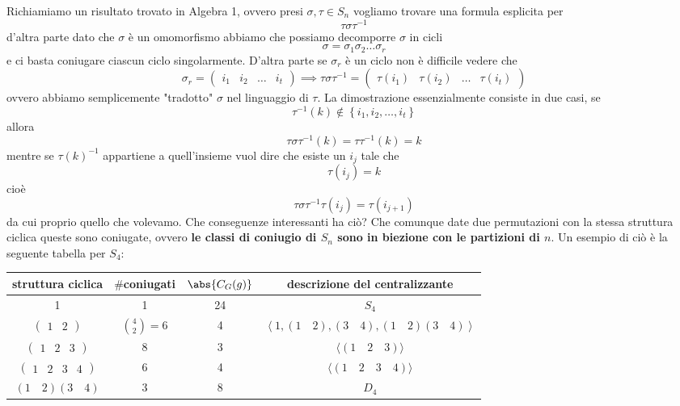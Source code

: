 \documentclass[11pt]{scrartcl}
\begin{document}
	Richiamiamo un risultato trovato in Algebra 1, ovvero presi $\sigma,\tau\in S_n$ vogliamo trovare una formula esplicita per
	$$\tau\sigma\tau^{-1}$$
	d'altra parte dato che $\sigma$ è un omomorfismo abbiamo che possiamo decomporre $\sigma$ in cicli 
	$$\sigma=\sigma_1\sigma_2\dots \sigma_r$$
	e ci basta coniugare ciascun ciclo singolarmente. D'altra parte se $\sigma_r$ è un ciclo non è difficile vedere che
	$$\sigma_r=\begin{pmatrix}
		i_1 & i_2 & \dots & i_t
	\end{pmatrix}\implies \tau\sigma\tau^{-1}=\begin{pmatrix}
	\tau(i_1) & \tau(i_2) & \dots & \tau(i_t)
	\end{pmatrix}$$
	ovvero abbiamo semplicemente "tradotto" $\sigma$ nel linguaggio di $\tau$. La dimostrazione essenzialmente consiste in due casi, se 
	$$\tau^{-1}(k)\not\in \left\{i_1,i_2,\dots,i_t\right\}$$
	allora 
	$$\tau\sigma\tau^{-1}(k)=\tau\tau^{-1}(k)=k$$
	mentre se $\tau(k)^{-1}$ appartiene a quell'insieme vuol dire che esiste un $i_j$ tale che
	$$\tau(i_j)=k$$
	cioè
	$$\tau\sigma \tau^{-1}\tau(i_j)=\tau(i_{j+1})$$
	da cui proprio quello che volevamo. Che conseguenze interessanti ha ciò? Che comunque date due permutazioni con la stessa struttura ciclica queste sono coniugate, ovvero \textbf{le classi di coniugio di $S_n$ sono in biezione con le partizioni di $n$}. Un esempio di ciò è la seguente tabella per $S_4$:
	\begin{center}
		\begin{tabular}{|c|c|c|c|}
			\hline
			struttura ciclica & $\#$coniugati & $\abs{C_G(g)}$ & descrizione del centralizzante \\
			\hline
			1 & 1 & 24 & $S_4$ \\
			\hline
			$\begin{pmatrix}
				1 & 2
			\end{pmatrix}$ & $\binom{4}{2}=6$ & 4 & $\left\langle1,\left(1\quad 2\right),\left(3\quad 4\right),\left(1 \quad 2\right)\left(3 \quad 4\right)\right\rangle$ \\
			\hline
			$\begin{pmatrix}
				1 & 2 & 3 
			\end{pmatrix}$ & 8 & 3 & $\langle(1 \quad 2 \quad 3) \rangle$ \\
			\hline
			$\begin{pmatrix}
				1 & 2 & 3 & 4
			\end{pmatrix}$ & 6 & 4 & $\langle\left(1 \quad 2 \quad 3 \quad 4\right)\rangle$ \\
			\hline
			$\left(1\quad 2\right)\left(3\quad 4\right)$ & 3 & 8 & $D_4$ \\
			\hline
		\end{tabular}
	\end{center}  
\end{document}
